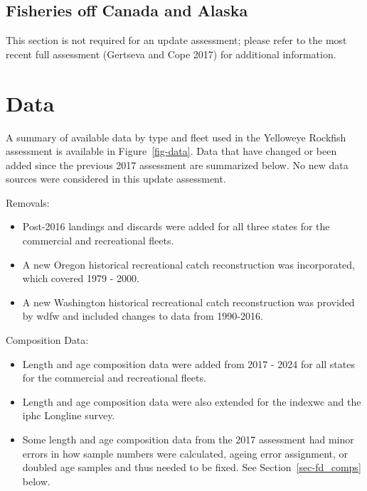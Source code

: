 \documentclass[
]{scrartcl}
\providecommand{\tightlist}{%
  \setlength{\itemsep}{0pt}\setlength{\parskip}{0pt}}\usepackage{longtable,booktabs,array}
\begin{document}
\subsection{Fisheries off Canada and
Alaska}\label{fisheries-off-canada-and-alaska}

This section is not required for an update assessment; please refer to
the most recent full assessment (Gertseva and Cope 2017) for additional
information.

\newpage{}

\section{Data}\label{sec-data}

A summary of available data by type and fleet used in the Yelloweye
Rockfish assessment is available in Figure~\ref{fig-data}. Data that
have changed or been added since the previous 2017 assessment are
summarized below. No new data sources were considered in this update
assessment.

Removals:

\begin{itemize}
\tightlist
\item
  Post-2016 landings and discards were added for all three states for
  the commercial and recreational fleets.
\item
  A new Oregon historical recreational catch reconstruction was
  incorporated, which covered 1979 - 2000.
\item
  A new Washington historical recreational catch reconstruction was
  provided by \gls{wdfw} and included changes to data from 1990-2016.
\end{itemize}

Composition Data:

\begin{itemize}
\tightlist
\item
  Length and age composition data were added from 2017 - 2024 for all
  states for the commercial and recreational fleets.
\item
  Length and age composition data were also extended for the
  \gls{indexwc} and the \gls{iphc} Longline survey.
\item
  Some length and age composition data from the 2017 assessment had
  minor errors in how sample numbers were calculated, ageing error
  assignment, or doubled age samples and thus needed to be fixed. See
  Section~\ref{sec-fd_comps} below.
\end{itemize}
\end{document}
